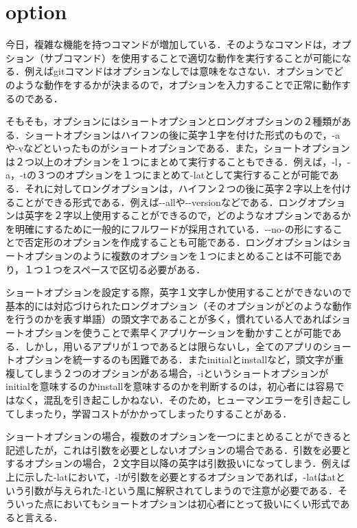     \section{option}\label{option}

今日，複雑な機能を持つコマンドが増加している．そのようなコマンドは，オプション（サブコマンド）を使用することで適切な動作を実行することが可能になる．例えばgitコマンドはオプションなしでは意味をなさない．オプションでどのような動作をするかが決まるので，オプションを入力することで正常に動作するのである．

そもそも，オプションにはショートオプションとロングオプションの２種類がある．ショートオプションはハイフンの後に英字１字を付けた形式のもので，-aや-vなどといったものがショートオプションである．また，ショートオプションは２つ以上のオプションを１つにまとめて実行することもできる．例えば，-l，-a，-tの３つのオプションを１つにまとめて-latとして実行することが可能である．それに対してロングオプションは，ハイフン２つの後に英字２字以上を付けることができる形式である．例えば-\/-allや-\/-versionなどである．ロングオプションは英字を２字以上使用することができるので，どのようなオプションであるかを明確にするために一般的にフルワードが採用されている．-\/-no-の形にすることで否定形のオプションを作成することも可能である．ロングオプションはショートオプションのように複数のオプションを１つにまとめることは不可能であり，１つ１つをスペースで区切る必要がある．

ショートオプションを設定する際，英字１文字しか使用することができないので基本的には対応づけられたロングオプション（そのオプションがどのような動作を行うのかを表す単語）の頭文字であることが多く，慣れている人であればショートオプションを使うことで素早くアプリケーションを動かすことが可能である．しかし，用いるアプリが１つであるとは限らないし，全てのアプリのショートオプションを統一するのも困難である．またinitialとinstallなど，頭文字が重複してしまう２つのオプションがある場合，-iというショートオプションがinitialを意味するのかinstallを意味するのかを判断するのは，初心者には容易ではなく，混乱を引き起こしかねない．そのため，ヒューマンエラーを引き起こしてしまったり，学習コストがかかってしまったりすることがある．

ショートオプションの場合，複数のオプションを一つにまとめることができると記述したが，これは引数を必要としないオプションの場合である．引数を必要とするオプションの場合，２文字目以降の英字は引数扱いになってしまう．例えば上に示した-latにおいて，-lが引数を必要とするオプションであれば，-latはatという引数が与えられた-lという風に解釈されてしまうので注意が必要である．そういった点においてもショートオプションは初心者にとって扱いにくい形式であると言える．

